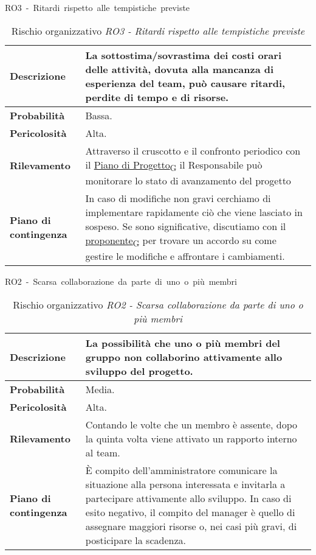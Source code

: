 \begin{table}[!h]
    \centering
    \hbox{RO3 - Ritardi rispetto alle tempistiche previste}
    \vspace{0.3cm}
	\begin{tabular}{|l|p{10cm}|} 
		\hline
		\textbf{Descrizione} & La sottostima/sovrastima dei costi orari delle attività, dovuta alla mancanza di esperienza del team, può causare ritardi, perdite di tempo e di risorse. \\ 
        \hline
        \textbf{Probabilità} & Bassa. \\
        \hline
        \textbf{Pericolosità} & Alta. \\
        \hline
        \textbf{Rilevamento} & Attraverso il cruscotto e il confronto periodico con il \href{https://7last.github.io/docs/rtb/documentazione-interna/glossario\#piano-di-progetto}{Piano di Progetto\textsubscript{G}} il Responsabile può monitorare lo stato di avanzamento del progetto \\
        \hline
        \textbf{Piano di contingenza} & In caso di modifiche non gravi cerchiamo di implementare rapidamente ciò che viene lasciato in sospeso. Se sono significative, discutiamo con il \href{https://7last.github.io/docs/rtb/documentazione-interna/glossario\#proponente}{proponente\textsubscript{G}} per trovare un accordo su come gestire le modifiche e affrontare i cambiamenti.\\
		\hline
	\end{tabular}
    \caption{Rischio organizzativo \textit{RO3 - Ritardi rispetto alle tempistiche previste}}
    \label{table:3}
\end{table}
\begin{table}[!h]
    \centering
    \hbox{RO2 - Scarsa collaborazione da parte di uno o più membri}
    \vspace{0.3cm}
	\begin{tabular}{|l|p{10cm}|} 
		\hline
		\textbf{Descrizione} & La possibilità che uno o più membri del gruppo non collaborino attivamente allo sviluppo del progetto. \\ 
        \hline
        \textbf{Probabilità} & Media. \\
        \hline
        \textbf{Pericolosità} & Alta. \\
        \hline
        \textbf{Rilevamento} & Contando le volte che un membro è assente, dopo la quinta volta viene attivato un rapporto interno al team.\\
        \hline
        \textbf{Piano di contingenza} & È compito dell'amministratore comunicare la situazione alla persona interessata e invitarla a partecipare attivamente allo sviluppo. In caso di esito negativo, il compito del manager è quello di assegnare maggiori risorse o, nei casi più gravi, di posticipare la scadenza.\\
		\hline
	\end{tabular}
    \caption{Rischio organizzativo \textit{RO2 - Scarsa collaborazione da parte di uno o più membri}}
    \label{table:4}
\end{table}

